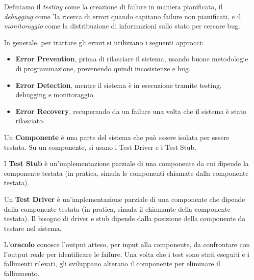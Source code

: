 \documentclass{article}
\begin{document}
    \vspace{3mm}
    
    Definiamo il \textit{testing} come la creazione di failure in maniera pianificata, il \textit{debugging} come 'la ricerca di errori quando capitano failure non pianificati, e il\textit{ monitoraggio} come la distribuzione di informazioni sullo stato per cercare bug.
    
    \vspace{3mm}
    
    In generale, per trattare gli errori si utilizzano i seguenti approcci:
    
    \begin{itemize}
        \item \textbf{Error Prevention}, prima di rilasciare il sistema, usando buone metodologie di programmazione, prevenendo quindi incosistenze e bug.
        \item \textbf{Error Detection}, mentre il sistema è in esecuzione tramite testing, debugging e monitoraggio.
        \item \textbf{Error Recovery}, recuperando da un failure una volta che il sistema è stato rilasciato.
    \end{itemize}

    Un \textbf{Componente} è una parte del sistema che può essere isolata per essere testata. Su un componente, si usano i Test Driver e i Test Stub. 
    
    \vspace{3mm}
    
    I \textbf{Test Stub} è un'implementazione parziale di una componente da cui dipende la componente testata (in pratica, simula le componenti chiamate dalla componente testata). 
    
    \vspace{3mm}
    
    Un \textbf{Test Driver} è un'implementazione parziale di una componente che dipende dalla componente testata (in pratica, simula il chiamante della componente testata). Il bisogno di driver e stub dipende dalla posizione della componente da testare nel sistema.
    
    \vspace{3mm}
    
    L'\textbf{oracolo} conosce l'output atteso, per input alla componente, da confrontare con l'output reale per identificare le failure. Una volta che i test sono stati eseguiti e i fallimenti rilevati, gli sviluppano alterano il componente per eliminare il falliumento.
    
\end{document}
